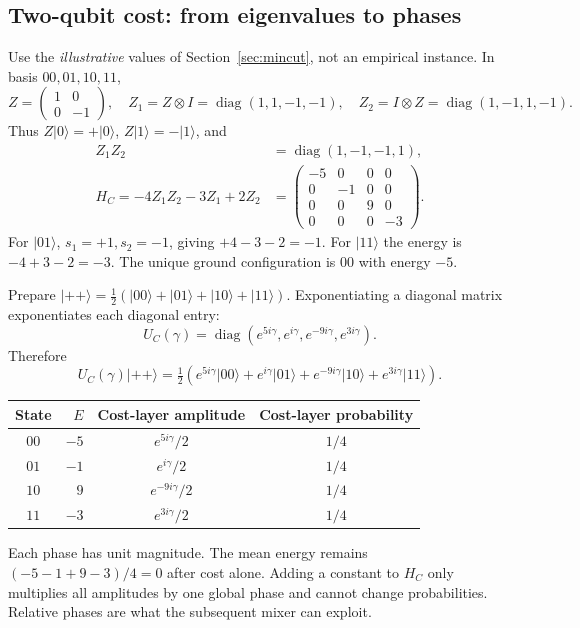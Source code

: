 \documentclass[11pt,letterpaper]{article}
\newcommand{\ket}[1]{\lvert #1\rangle}
\begin{document}
\subsection{Two-qubit cost: from eigenvalues to phases}\label{sec:costexample}
Use the \emph{illustrative} values of Section~\ref{sec:mincut}, not an empirical instance. In basis $00,01,10,11$,
\[
 Z=\begin{pmatrix}1&0\\0&-1\end{pmatrix},\quad
 Z_1=Z\otimes I=\operatorname{diag}(1,1,-1,-1),\quad
 Z_2=I\otimes Z=\operatorname{diag}(1,-1,1,-1).
\]
Thus $Z\ket0=+\ket0$, $Z\ket1=-\ket1$, and
\begin{align}
 Z_1Z_2&=\operatorname{diag}(1,-1,-1,1),\\
 H_C=-4Z_1Z_2-3Z_1+2Z_2
 &=\begin{pmatrix}-5&0&0&0\\0&-1&0&0\\0&0&9&0\\0&0&0&-3\end{pmatrix}.\label{eq:twoH}
\end{align}
For $\ket{01}$, $s_1=+1,s_2=-1$, giving $+4-3-2=-1$. For $\ket{11}$ the energy is $-4+3-2=-3$. The unique ground configuration is $00$ with energy $-5$.

Prepare $\ket{++}=\frac12(\ket{00}+\ket{01}+\ket{10}+\ket{11})$. Exponentiating a diagonal matrix exponentiates each diagonal entry:
\begin{equation}
 U_C(\gamma)=\operatorname{diag}(e^{5i\gamma},e^{i\gamma},e^{-9i\gamma},e^{3i\gamma}).
\end{equation}
Therefore
\begin{equation}
 U_C(\gamma)\ket{++}=\tfrac12\left(e^{5i\gamma}\ket{00}+e^{i\gamma}\ket{01}
 +e^{-9i\gamma}\ket{10}+e^{3i\gamma}\ket{11}\right).\label{eq:phase}
\end{equation}
\begin{center}\begin{tabular}{@{}crcc@{}}\toprule
State & $E$ & Cost-layer amplitude & Cost-layer probability\\\midrule
$00$ & $-5$ & $e^{5i\gamma}/2$ & $1/4$\\
$01$ & $-1$ & $e^{i\gamma}/2$ & $1/4$\\
$10$ & $9$ & $e^{-9i\gamma}/2$ & $1/4$\\
$11$ & $-3$ & $e^{3i\gamma}/2$ & $1/4$\\\bottomrule
\end{tabular}\end{center}
Each phase has unit magnitude. The mean energy remains $(-5-1+9-3)/4=0$ after cost alone. Adding a constant to $H_C$ only multiplies all amplitudes by one global phase and cannot change probabilities. Relative phases are what the subsequent mixer can exploit.
\end{document}
